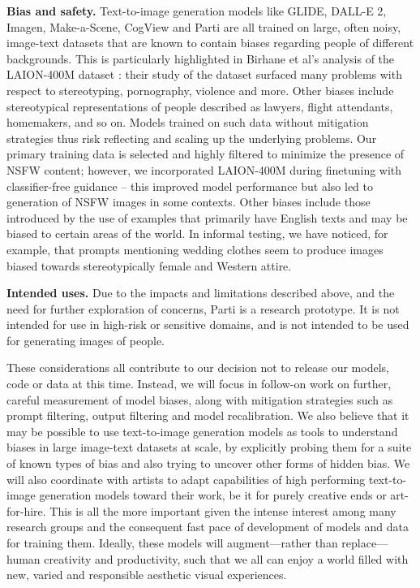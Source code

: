 \textbf{Bias and safety.} Text-to-image generation models like GLIDE, DALL-E 2, Imagen, Make-a-Scene, CogView and Parti are all trained on large, often noisy, image-text datasets that are known to contain biases regarding people of different backgrounds. This is particularly highlighted in Birhane et al's \cite{birhane2021multimodal} analysis of the LAION-400M dataset \cite{schuhmann2021laion}: their study of the dataset surfaced many problems with respect to stereotyping, pornography, violence and more. Other biases include stereotypical representations of people described as lawyers, flight attendants, homemakers, and so on. Models trained on such data without mitigation strategies thus risk reflecting and scaling up the underlying problems. Our primary training data is selected and highly filtered to minimize the presence of NSFW content; however, we incorporated LAION-400M during finetuning with classifier-free guidance -- this improved model performance but also led to generation of NSFW images in some contexts. Other biases include those introduced by the use of examples that primarily have English texts and may be biased to certain areas of the world. In informal testing, we have noticed, for example, that prompts mentioning wedding clothes seem to produce images biased towards stereotypically female and Western attire.

\textbf{Intended uses.} Due to the impacts and limitations described above, and the need for further exploration of concerns, Parti is a research prototype. It is not intended for use in high-risk or sensitive domains, and is not intended to be used for generating images of people.

These considerations all contribute to our decision not to release our models, code or data at this time. Instead, we will focus in follow-on work on further, careful measurement of model biases, along with mitigation strategies such as prompt filtering, output filtering and model recalibration. We also believe that it may be possible to use text-to-image generation models as tools to understand biases in large image-text datasets at scale, by explicitly probing them for a suite of known types of bias and also trying to uncover other forms of hidden bias.  We will also coordinate with artists to adapt capabilities of high performing text-to-image generation models toward their work, be it for purely creative ends or art-for-hire. This is all the more important given the intense interest among many research groups and the consequent fast pace of development of models and data for training them. Ideally, these models will augment---rather than replace---human creativity and productivity, such that we all can enjoy a world filled with new, varied and responsible aesthetic visual experiences.

